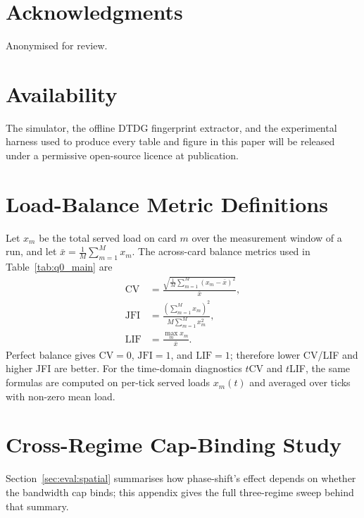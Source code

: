 \documentclass[letterpaper,twocolumn,10pt]{article}
\begin{document}
\section*{Acknowledgments}

Anonymised for review.

\section*{Availability}

The simulator, the offline DTDG fingerprint extractor, and the experimental harness used to produce every table and figure in this paper will be released under a permissive open-source licence at publication.


\appendix

\section{Load-Balance Metric Definitions}
\label{app:metrics}

Let $x_m$ be the total served load on card $m$ over the measurement window of a run, and let
$\bar{x}=\frac{1}{M}\sum_{m=1}^{M}x_m$. The across-card balance metrics used in Table~\ref{tab:q0_main} are
\begin{align}
\mathrm{CV} &= \frac{\sqrt{\frac{1}{M}\sum_{m=1}^{M}(x_m-\bar{x})^2}}{\bar{x}}, \\
\mathrm{JFI} &= \frac{\left(\sum_{m=1}^{M}x_m\right)^2}{M\sum_{m=1}^{M}x_m^2}, \\
\mathrm{LIF} &= \frac{\max_{m} x_m}{\bar{x}}.
\end{align}
Perfect balance gives $\mathrm{CV}=0$, $\mathrm{JFI}=1$, and $\mathrm{LIF}=1$; therefore lower CV/LIF and higher JFI are better. For the time-domain diagnostics $t$CV and $t$LIF, the same formulas are computed on per-tick served loads $x_m(t)$ and averaged over ticks with non-zero mean load.

\section{Cross-Regime Cap-Binding Study}
\label{app:regime}

Section~\ref{sec:eval:spatial} summarises how phase-shift's effect depends on whether the bandwidth cap binds; this appendix gives the full three-regime sweep behind that summary.
\end{document}
